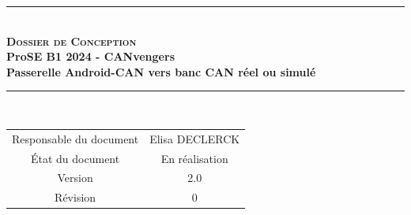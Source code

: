 \documentclass[a4paper,11pt,titlepage,french]{article}
\newcommand{\version}{2.0}
\newcommand{\revision}{0}
\newcommand{\documentName}{Dossier de Conception}
\newcommand{\prose}{ProSE}
\newcommand{\creator}{Elisa DECLERCK}
\newcommand{\projectName}{Passerelle Android-CAN vers banc CAN réel ou simulé} %
\newcommand{\annee}{2024}
\newcommand{\teamName}{CANvengers}
\newcommand{\teamNumber}{B1}
\begin{document}
\makeatother
\begin{center} %
    \vspace*{2cm} %
    \rule[0.5ex]{0.7\textwidth}{0.1mm}\\ %
    \vspace*{2mm} %
        {\Huge {\textsc{\bf {\documentName}}}} %
    \vspace{0.4cm}\\ %
        {\large\bf {\prose} {\teamNumber} {\annee} - {\teamName}}\\ %
    \vspace*{1mm}
        {\large\bf {\projectName}}\\ %
    \rule[0.5ex]{0.75\textwidth}{0.1mm}\\ %
    \vspace{2cm} 
    \begin{tabular}{|c|c|} %
        \hline %
            Responsable du document & {\creator}                      \\
            État du document        & En réalisation                  \\
            Version                 & {\version}                      \\
            Révision                & {\revision}                     \\
        \hline
    \end{tabular}
\end{center}
\vspace{3cm} 

 

\end{document}
